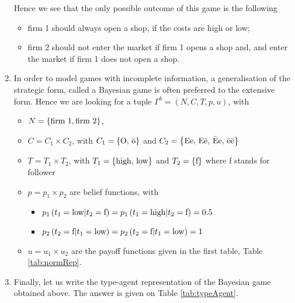 \begin{enumerate}[label=\alph*.]
	      Hence we see that the only possible outcome of this game is the following
	      \begin{itemize}
	      	\item firm 1 should always open a shop, if the costs are high or low;
	      	\item firm 2 should not enter the market if firm 1 opens a shop and, and enter the market if firm 1 does not open a shop.
	      \end{itemize}

	\item In order to model games with incomplete information, a generalisation of the strategic form, called a Bayesian game is often preferred to the extensive form. Hence we are looking for a tuple $\Gamma^b = (N,C,T,p,u)$, with
	      \begin{itemize}
	      	\item $N = \left\{\text{firm 1}, \text{firm 2}\right\}$,
	      	\item $C = C_1 \times C_2$, with $C_1 = \left\{\text{O, \=o}\right\}$ and $C_2 = \left\{\text{Ee, E\=e, \=Ee, \=e\=e}\right\}$
	      	\item $T = T_1 \times T_2$, with $T_1 = \left\{\text{high, low}\right\}$ and $T_2 = \left\{\text{f}\right\}$ where f stands for follower
	      	\item $p = p_1 \times p_2$ are belief functions, with
	      	      \begin{itemize}
	      	      	\item $p_1 \left(t_1 = \text{low} | t_2 = \text{f}\right) = p_1 \left(t_1 = \text{high} | t_2 = \text{f}\right) = 0.5 $
	      	      	\item $p_2 \left( t_2 = \text{f} | t_1 = \text{low}\right) = p_2 \left( t_2 = \text{f} | t_1 = \text{low}\right) = 1 $
	      	      \end{itemize}
	      	\item $u = u_1 \times u_2$ are the payoff functions given in the first table, Table \ref{tab:normRep}.

	      \end{itemize}

	\item Finally, let us write the type-agent representation of the Bayesian game obtained above. The answer is given on Table \ref{tab:typeAgent}.


\end{enumerate}
